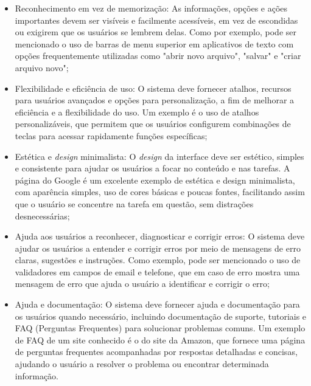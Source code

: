 \begin{description}
\begin{itemize}
            \item Reconhecimento em vez de memorização: As informações, opções e ações importantes devem ser visíveis e 
            facilmente acessíveis, em vez de escondidas ou exigirem que os usuários se lembrem delas. Como por exemplo, pode ser mencionado 
            o uso de barras de menu superior em aplicativos de texto com opções frequentemente utilizadas como "abrir novo arquivo", "salvar" e "criar 
            arquivo novo";

            \item Flexibilidade e eficiência de uso: O sistema deve fornecer atalhos, recursos para usuários avançados e 
            opções para personalização, a fim de melhorar a eficiência e a flexibilidade do uso. Um exemplo é o uso de atalhos personalizáveis, que 
            permitem que os usuários configurem combinações de teclas para acessar rapidamente funções específicas;

            \item Estética e \textit{design} minimalista: O \textit{design} da interface deve ser estético, simples e consistente para ajudar
             os usuários a focar no conteúdo e nas tarefas. A página do Google é um excelente exemplo de estética e design minimalista, com aparência simples, 
             uso de cores básicas e poucas fontes, facilitando assim que o usuário se concentre na tarefa em questão, sem distrações desnecessárias; 
            
            \item Ajuda aos usuários a reconhecer, diagnosticar e corrigir erros: O sistema deve ajudar os usuários a entender e corrigir erros por meio de mensagens 
            de erro claras, sugestões e instruções. Como exemplo, pode ser mencionado o uso de validadores em campos de email e telefone, que em caso de erro mostra uma 
            mensagem de erro que ajuda o usuário a identificar e corrigir o erro;

            \item Ajuda e documentação: O sistema deve fornecer ajuda e documentação para os usuários quando necessário, incluindo 
            documentação de suporte, tutoriais e FAQ (Perguntas Frequentes) para solucionar problemas comuns. Um exemplo de FAQ de um site conhecido é o do site da 
            Amazon, que fornece uma página de perguntas frequentes acompanhadas por respostas detalhadas e concisas, ajudando o usuário a resolver o problema ou encontrar 
            determinada informação.
        \end{itemize}
\end{description}

